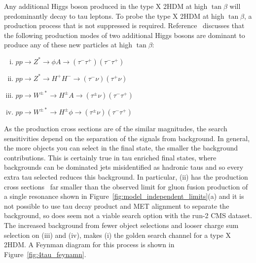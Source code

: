 Any additional Higgs boson produced in the type X \ac{2HDM} at high $\tan\beta$ will predominantly decay to tau leptons.
To probe the type X \ac{2HDM} at high $\tan\beta$, a production process that is not suppressed is required.
Reference~\cite{Jueid:2021avn} discusses that the following production modes of two additional Higgs bosons are dominant to produce any of these new particles at high $\tan\beta$:
\begin{enumerate}[i)]
  \item $pp \rightarrow Z^{*} \rightarrow \phi A \rightarrow (\tau^{-}\tau^{+})(\tau^{-}\tau^{+})$
  \item $pp \rightarrow Z^{*} \rightarrow H^{+}H^{-} \rightarrow (\tau^{-}\nu)(\tau^{+}\nu)$
  \item $pp \rightarrow W^{\pm *} \rightarrow H^{\pm}A \rightarrow (\tau^{\pm}\nu)(\tau^{-}\tau^{+})$
  \item $pp \rightarrow W^{\pm *} \rightarrow H^{\pm}\phi \rightarrow (\tau^{\pm}\nu)(\tau^{-}\tau^{+})$
\end{enumerate}
As the production cross sections are of the similar magnitudes, the search sensitivities depend on the separation of the signals from background.
In general, the more objects you can select in the final state, the smaller the background contributions.
This is certainly true in tau enriched final states, where backgrounds can be dominated jets misidentified as hadronic taus and so every extra tau selected reduces this background.
In particular, (ii) has the production cross sections~\cite{Jueid:2021avn} far smaller than the observed limit for gluon fusion production of a single resonance shown in Figure~\ref{fig:model_independent_limits}(a) and it is not possible to use tau decay product and MET alignment to separate the background, so does seem not a viable search option with the run-2 CMS dataset.
The increased background from fewer object selections and looser charge sum selection on (iii) and (iv), makes (i) the golden search channel for a type X 2HDM. 
A Feynman diagram for this process is shown in Figure~\ref{fig:4tau_feynamn}. \\

